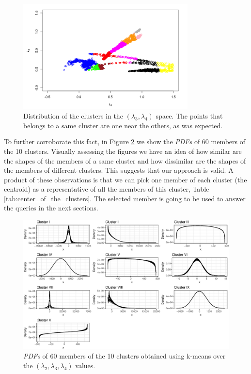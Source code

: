 \begin{figure}[H]
    \centering
    \includegraphics[width=0.8\textwidth]{images/Clusters_lambda3_lambda4.png}
    \caption{Distribution of the clusters in the $(\lambda_{3}, \lambda_{4})$ space. The points that belongs to a same cluster are one near the others, as was expected.}
    \label{fig:clusters_lambda3_lambda4_space}
\end{figure}

To further corroborate this fact, in Figure \ref{fig:cluster1} we show the \textit{PDFs} of 60 members of the 10 clusters. Visually assessing the figures we have an idea of how similar are the shapes of the members of a same cluster and how dissimilar are the shapes of the  members of different clusters. This suggests that our approach is valid. A product of these observations is that we can pick one member of each cluster (the centroid) as a representative of all the members of this cluster, Table \ref{tab:center_of_the_clusters}. The selected member is going to be used to answer the queries in the next sections.

\begin{figure}[ht]
    \centering
    \includegraphics[width=\textwidth]{img/use_cases/clusters.eps}
    \caption{\textit{PDFs} of 60 members of the 10 clusters obtained using k-means over the $(\lambda_{2}, \lambda_{3}, \lambda_{4})$ values.}
    \label{fig:cluster1}
\end{figure}


